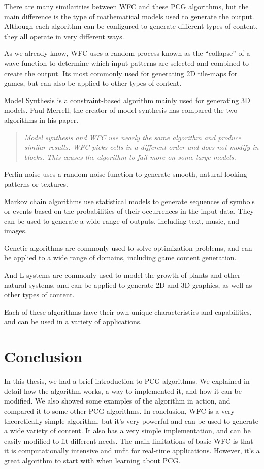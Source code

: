 \documentclass[10pt,oneside,a4paper]{article}
\begin{document}
There are many similarities between WFC and these PCG algorithms, but the main difference is the type of mathematical models used to generate the output.
Although each algorithm can be configured to generate different types of content, they all operate in very different ways.

As we already know, WFC uses a random process known as the ``collapse'' of a wave function to determine which input patterns are selected and combined to create the output.
Its most commonly used for generating 2D tile-maps for games, but can also be applied to other types of content.

Model Synthesis is a constraint-based algorithm mainly used for generating 3D models.
Paul Merrell, the creator of model synthesis has compared the two algorithms in his paper\cite{Mer21}.
\begin{quote}
    \textit{Model synthesis and WFC use nearly the same algorithm and produce similar results. WFC picks cells in a different
order and does not modify in blocks. This causes the algorithm to fail more on some large models.}
\end{quote}

Perlin noise uses a random noise function to generate smooth, natural-looking patterns or textures\cite{PerNoise}.

Markov chain algorithms use statistical models to generate sequences of symbols or events based on the probabilities of their occurrences in the input data.
They can be used to generate a wide range of outputs, including text, music, and images\cite{MCHAIN}.

Genetic algorithms are commonly used to solve optimization problems, and can be applied to a wide range of domains, including game content generation\cite{GeneticAA}.

And L-systems are commonly used to model the growth of plants and other natural systems, and can be applied to generate 2D and 3D graphics, as well as other types of content\cite{LSys}.

Each of these algorithms have their own unique characteristics and capabilities, and can be used in a variety of applications.

\section{Conclusion}\label{sec:conclusion}
In this thesis, we had a brief introduction to PCG algorithms.
We explained in detail how the algorithm works, a way to implemented it, and how it can be modified.
We also showed some examples of the algorithm in action, and compared it to some other PCG algorithms.
In conclusion, WFC is a very theoretically simple algorithm, but it's very powerful and can be used to generate a wide variety of content.
It also has a very simple implementation, and can be easily modified to fit different needs.
The main limitations of basic WFC is that it is computationally intensive and unfit for real-time applications. 
However, it's a great algorithm to start with when learning about PCG\@.
\newpage


\end{document}
